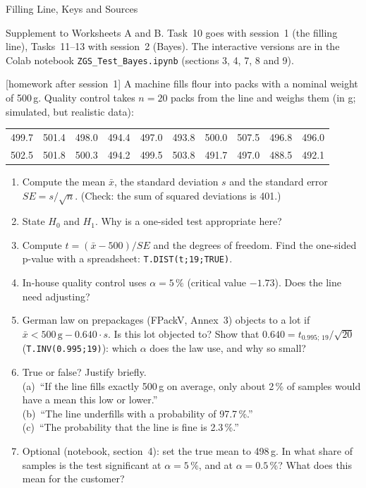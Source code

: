 \begin{uebungsblattc}{Filling Line, Keys and Sources}
\setcounter{wuzaufgabe}{9}%
\noindent{\small \wuzpersonname: \rule{55mm}{0.3pt}\hfill \wuzdatumname: \rule{30mm}{0.3pt}}\par\medskip
\noindent Supplement to Worksheets A and B. Task~10 goes with session~1
(the filling line), Tasks~11--13 with session~2 (Bayes). The interactive
versions are in the Colab notebook \texttt{ZGS\_Test\_Bayes.ipynb}
(sections 3, 4, 7, 8 and 9).

[homework after session~1]
A machine fills flour into packs with a nominal weight of 500\,g. Quality
control takes $n=20$ packs from the line and weighs them (in g;
simulated, but realistic data):

\begin{center}
\small
\setlength{\tabcolsep}{4pt}
\begin{tabular}{@{}*{10}{c}@{}}
\toprule
499.7 & 501.4 & 498.0 & 494.4 & 497.0 & 493.8 & 500.0 & 507.5 & 496.8 & 496.0 \\
502.5 & 501.8 & 500.3 & 494.2 & 499.5 & 503.8 & 491.7 & 497.0 & 488.5 & 492.1 \\
\bottomrule
\end{tabular}
\end{center}
\begin{enumerate}
  \item Compute the mean $\bar{x}$, the standard deviation $s$ and the
    standard error $\mathit{SE}=s/\sqrt{n}$. (Check: the sum of squared
    deviations is 401.)
  \item State $H_0$ and $H_1$. Why is a one-sided test appropriate here?
  \item Compute $t=(\bar{x}-500)/\mathit{SE}$ and the degrees of freedom.
    Find the one-sided p-value with a spreadsheet:
    \texttt{T.DIST(t;19;TRUE)}.
  \item In-house quality control uses $\alpha=5\,\%$ (critical value
    $-1.73$). Does the line need adjusting?
  \item German law on prepackages (FPackV, Annex~3) objects to a lot if
    $\bar{x}<500\,\text{g}-0.640\cdot s$. Is this lot objected to? Show
    that $0.640=t_{0.995;\,19}/\sqrt{20}$ (\texttt{T.INV(0.995;19)}): which
    $\alpha$ does the law use, and why so small?
  \item True or false? Justify briefly.\\
    (a)~\enquote{If the line fills exactly 500\,g on average, only about
    2\,\% of samples would have a mean this low or lower.}\\
    (b)~\enquote{The line underfills with a probability of 97.7\,\%.}\\
    (c)~\enquote{The probability that the line is fine is 2.3\,\%.}
  \item Optional (notebook, section~4): set the true mean to 498\,g. In
    what share of samples is the test significant at $\alpha=5\,\%$, and
    at $\alpha=0.5\,\%$? What does this mean for the customer?
\end{enumerate}


\end{uebungsblattc}
